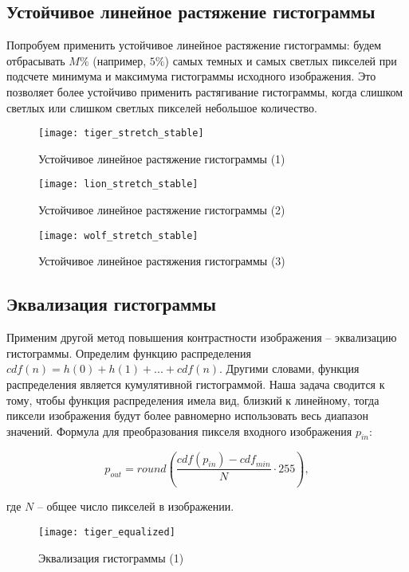 \subsection{Устойчивое линейное растяжение гистограммы}

Попробуем применить устойчивое линейное растяжение гистограммы: будем отбрасывать $M\%$ (например, $5\%$) самых темных и самых светлых пикселей при подсчете минимума и максимума гистограммы исходного изображения. Это позволяет более устойчиво применить растягивание гистограммы, когда слишком светлых или слишком светлых пикселей небольшое количество.

\begin{figure}[H]
	\centering
	\texttt{[image: tiger\_stretch\_stable]}
	\caption{Устойчивое линейное растяжение гистограммы (1)}
\end{figure}

\begin{figure}[H]
	\centering
	\texttt{[image: lion\_stretch\_stable]}
	\caption{Устойчивое линейное растяжение гистограммы (2)}
\end{figure}

\begin{figure}[H]
	\centering
	\texttt{[image: wolf\_stretch\_stable]}
	\caption{Устойчивое линейное растяжения гистограммы (3)}
\end{figure}

\subsection{Эквализация гистограммы}

Применим другой метод повышения контрастности изображения -- эквализацию гистограммы. Определим функцию распределения $\mathit{cdf}(n) = h(0) + h(1) + ... + \mathit{cdf}(n)$. Другими словами, функция распределения является кумулятивной гистограммой. Наша задача сводится к тому, чтобы функция распределения имела вид, близкий к линейному, тогда пиксели изображения будут более равномерно использовать весь диапазон значений. Формула для преобразования пикселя входного изображения $p_{in}$:

$$
p_{out} = \mathit{round} \left( \frac{\mathit{cdf}(p_{in}) - \mathit{cdf}_{min}}{N} \cdot 255 \right),
$$

где $N$ -- общее число пикселей в изображении.

\begin{figure}[H]
	\centering
	\texttt{[image: tiger\_equalized]}
	\caption{Эквализация гистограммы (1)}
\end{figure}

